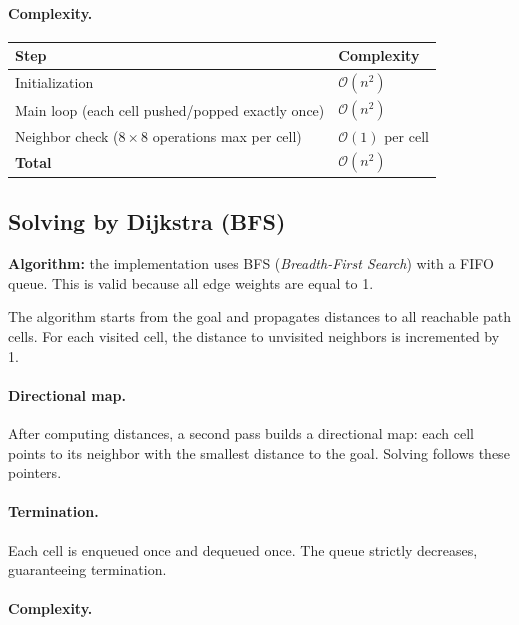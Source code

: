 \documentclass[12pt, a4paper]{article}
\theoremstyle{definition}
\newcommand{\bigO}[1]{\mathcal{O}\!\left(#1\right)}
\begin{document}
\paragraph{Complexity.}

\begin{center}
\begin{tabular}{ll}
    \toprule
    Step & Complexity \\
    \midrule
    Initialization & $\bigO{n^2}$ \\
    Main loop (each cell pushed/popped exactly once) & $\bigO{n^2}$ \\
    Neighbor check ($8 \times 8$ operations max per cell) & $\bigO{1}$ per cell \\
    \midrule
    \textbf{Total} & $\bigO{n^2}$ \\
    \bottomrule
\end{tabular}
\end{center}

\subsection{Solving by Dijkstra (BFS)}

\textbf{Algorithm:} the implementation uses BFS (\emph{Breadth-First Search}) with a
FIFO queue. This is valid because all edge weights are equal to 1.

The algorithm starts from the goal and propagates distances to all reachable path cells.
For each visited cell, the distance to unvisited neighbors is incremented by 1.

\paragraph{Directional map.}
After computing distances, a second pass builds a directional map: each cell points
to its neighbor with the smallest distance to the goal. Solving follows these pointers.

\paragraph{Termination.}
Each cell is enqueued once and dequeued once. The queue strictly decreases,
guaranteeing termination.

\paragraph{Complexity.}
\end{document}
